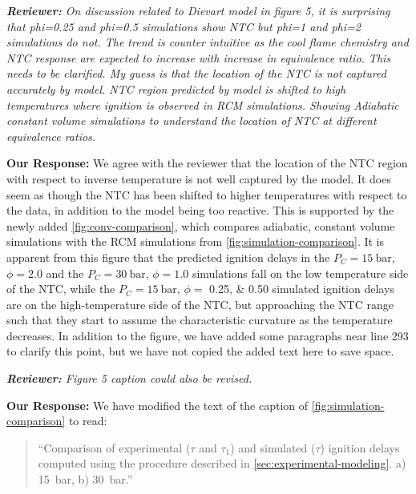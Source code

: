 \documentclass{article}
\newenvironment{reviewer}{\vspace{0.5\baselineskip}\begingroup\itshape\textbf{Reviewer:}}{\endgroup\vspace{0.5\baselineskip}}
\newenvironment{response}{\vspace{0.5\baselineskip}\textbf{Our Response:}}{\vspace{0.5\baselineskip}}
\begin{document}
\begin{reviewer}
    On discussion related to Dievart model in figure 5, it is surprising that phi=0.25 and phi=0.5
    simulations show NTC but phi=1 and phi=2 simulations do not. The trend is counter intuitive as
    the cool flame chemistry and NTC response are expected to increase with increase in equivalence
    ratio. This needs to be clarified. My guess is that the location of the NTC is not captured
    accurately by model. NTC region predicted by model is shifted to high temperatures where
    ignition is observed in RCM simulations. Showing Adiabatic constant volume simulations to
    understand the location of NTC at different equivalence ratios.
\end{reviewer}

\begin{response}
    We agree with the reviewer that the location of the NTC region with respect to inverse
    temperature is not well captured by the model. It does seem as though the NTC has been shifted
    to higher temperatures with respect to the data, in addition to the model being too reactive.
    This is supported by the newly added \cref{fig:conv-comparison}, which compares adiabatic,
    constant volume simulations with the RCM simulations from \cref{fig:simulation-comparison}. It
    is apparent from this figure that the predicted ignition delays in the $P_C = \SI{15}{\bar}$,
    $\phi = \num{2.0}$ and the $P_C = \SI{30}{\bar}$, $\phi = \num{1.0}$ simulations fall on the low
    temperature side of the NTC, while the $P_C = \SI{15}{\bar}$, $\phi =$ \numlist{0.25;0.50}
    simulated ignition delays are on the high-temperature side of the NTC, but approaching the NTC
    range such that they start to assume the characteristic curvature as the temperature decreases.
    In addition to the figure, we have added some paragraphs near line 293 to clarify this point,
    but we have not copied the added text here to save space.
\end{response}

\begin{reviewer}
    Figure 5 caption could also be revised.
\end{reviewer}

\begin{response}
    We have modified the text of the caption of \cref{fig:simulation-comparison} to read:

    \begin{quote}
        ``Comparison of experimental (\(\tau\) and \(\tau_1\)) and simulated (\(\tau\)) ignition delays
        computed using the procedure described in \cref{sec:experimental-modeling}. a)
        \SI{15}{\bar}, b) \SI{30}{\bar}.''
    \end{quote}
\end{response}
\end{document}
